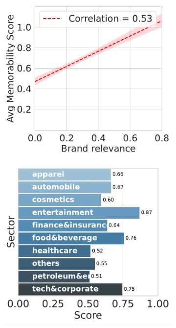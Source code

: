 \begin{landscape}
\begin{figure}[]
\begin{subfigure}{0.3\textwidth}
        \caption{}
        \label{subfig:popularity vs recall}
    \end{subfigure}
    \begin{subfigure}{0.3\textwidth}
        \centering
        \includegraphics[width=\textwidth]{images/relevance_vs_recall.pdf}
        \caption{}
        \label{subfig:relevance vs recall}
    \end{subfigure}
    \begin{subfigure}{0.3\textwidth}
        \centering
        \includegraphics[width=\textwidth]{images/avg_recall_by_sector.pdf}

\end{subfigure}
\end{figure}
\end{landscape}
